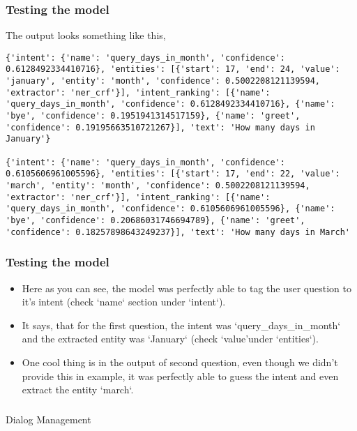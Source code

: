  \begin{frame}[fragile]\frametitle{Testing the model}
The output looks something like this,


\begin{lstlisting}
{'intent': {'name': 'query_days_in_month', 'confidence': 0.6128492334410716}, 'entities': [{'start': 17, 'end': 24, 'value': 'january', 'entity': 'month', 'confidence': 0.5002208121139594, 'extractor': 'ner_crf'}], 'intent_ranking': [{'name': 'query_days_in_month', 'confidence': 0.6128492334410716}, {'name': 'bye', 'confidence': 0.1951941314517159}, {'name': 'greet', 'confidence': 0.19195663510721267}], 'text': 'How many days in January'}

{'intent': {'name': 'query_days_in_month', 'confidence': 0.6105606961005596}, 'entities': [{'start': 17, 'end': 22, 'value': 'march', 'entity': 'month', 'confidence': 0.5002208121139594, 'extractor': 'ner_crf'}], 'intent_ranking': [{'name': 'query_days_in_month', 'confidence': 0.6105606961005596}, {'name': 'bye', 'confidence': 0.20686031746694789}, {'name': 'greet', 'confidence': 0.18257898643249237}], 'text': 'How many days in March'
\end{lstlisting}

\end{frame}

 \begin{frame}[fragile]\frametitle{Testing the model}

\begin{itemize}
\item Here as you can see, the model was perfectly able to tag the user question to it’s intent (check ‘name‘ section under ‘intent‘). 
\item It says, that for the first question, the intent was ‘query\_days\_in\_month‘ and the extracted entity was ‘January‘ (check ‘value’under ‘entities‘). 
\item One cool thing is in the output of second question, even though we didn’t provide this in example, it was perfectly able to guess the intent and even extract the entity ‘march‘.
\end{itemize}
\end{frame}


\begin{frame}[fragile]\frametitle{}
\begin{center}
{\Large Dialog Management}
\end{center}
\end{frame}

